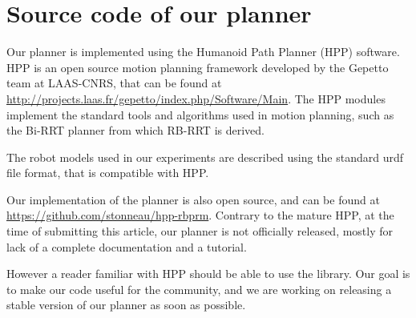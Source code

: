 \section{Source code of our planner}
\label{app:hpp}
Our planner is implemented using the Humanoid Path Planner (HPP) software.
HPP is an open source motion planning framework developed by the Gepetto team at LAAS-CNRS, that can be found at \url{http://projects.laas.fr/gepetto/index.php/Software/Main}.
The HPP modules implement the standard tools and algorithms used in motion planning,
such as the Bi-RRT planner from which RB-RRT is derived.

The robot models used in our experiments are described using the standard urdf file format, that is 
compatible with HPP.

Our implementation of the planner is also open source, and can be found at \url{https://github.com/stonneau/hpp-rbprm}. 
Contrary to the mature HPP, at the time of submitting this article,
our planner is not officially released, mostly for lack of a complete documentation and a tutorial.

However a reader familiar with HPP should be able to use the library.
Our goal is to make our code useful for the community, and we are working on releasing a stable 
version of our planner as soon as possible.
